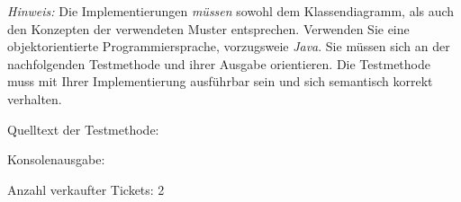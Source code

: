 \documentclass{lehramt-informatik-aufgabe}
\begin{document}
\begin{enumerate}
\begin{liAntwort}
\end{liAntwort}

\emph{Hinweis:} Die Implementierungen \emph{müssen} sowohl dem
Klassendiagramm, als auch den Konzepten der verwendeten Muster
entsprechen. Verwenden Sie eine objektorientierte Programmiersprache,
vorzugsweie \emph{Java}. Sie müssen sich an der nachfolgenden
Testmethode und ihrer Ausgabe orientieren. Die Testmethode muss mit
Ihrer Implementierung ausführbar sein und sich semantisch korrekt
verhalten.

Quelltext der Testmethode:


Konsolenausgabe:

Anzahl verkaufter Tickets: 2

\end{enumerate}
\end{document}

